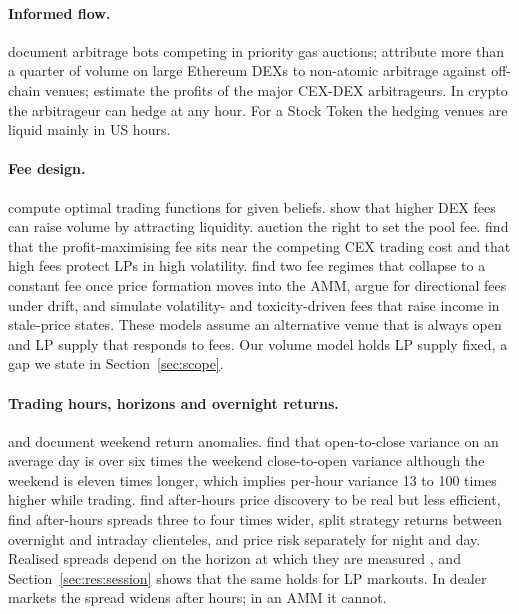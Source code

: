 \documentclass[11pt]{article}
\begin{document}
\paragraph{Informed flow.} \citet{daian2020flash} document arbitrage bots competing in priority gas auctions; \citet{heimbach2024nonatomic} attribute more than a quarter of volume on large Ethereum DEXs to non-atomic arbitrage against off-chain venues; \citet{wu2025cexdex} estimate the profits of the major CEX-DEX arbitrageurs. In crypto the arbitrageur can hedge at any hour. For a Stock Token the hedging venues are liquid mainly in US hours.

\paragraph{Fee design.} \citet{goyal2023curve} compute optimal trading functions for given beliefs. \citet{hasbrouck2026fees} show that higher DEX fees can raise volume by attracting liquidity. \citet{adams2026amamm} auction the right to set the pool fee. \citet{campbell2025optimal} find that the profit-maximising fee sits near the competing CEX trading cost and that high fees protect LPs in high volatility. \citet{baggiani2025dynamic} find two fee regimes that collapse to a constant fee once price formation moves into the AMM, \citet{alexander2024fees} argue for directional fees under drift, and \citet{dinosse2026dynamic} simulate volatility- and toxicity-driven fees that raise income in stale-price states. These models assume an alternative venue that is always open and LP supply that responds to fees. Our volume model holds LP supply fixed, a gap we state in Section~\ref{sec:scope}.

\paragraph{Trading hours, horizons and overnight returns.} \citet{french1980weekend} and \citet{keim1984weekend} document weekend return anomalies. \citet{french1986variances} find that open-to-close variance on an average day is over six times the weekend close-to-open variance although the weekend is eleven times longer, which implies per-hour variance 13 to 100 times higher while trading. \citet{barclay2003price} find after-hours price discovery to be real but less efficient, \citet{barclay2004liquidity} find after-hours spreads three to four times wider, \citet{lou2019tug} split strategy returns between overnight and intraday clienteles, and \citet{hendershott2020night} price risk separately for night and day. Realised spreads depend on the horizon at which they are measured \citep{bessembinder2003issues,conrad2020term}, and Section~\ref{sec:res:session} shows that the same holds for LP markouts. In dealer markets the spread widens after hours; in an AMM it cannot.
\end{document}

